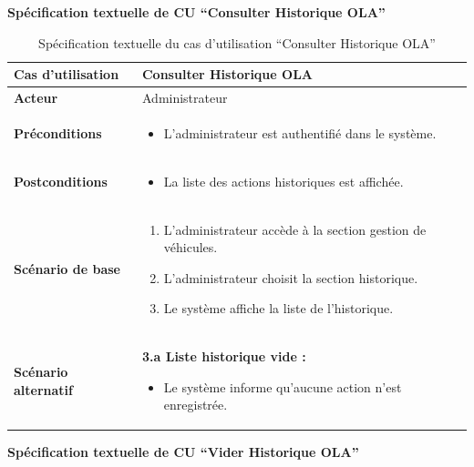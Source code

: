 \documentclass[a4paper,11pt]{report}
\begin{document}
\textbf{Spécification textuelle de CU ``Consulter Historique OLA''}

\begin{table}[H]
  \centering
  \renewcommand{\arraystretch}{1.5}
  \caption{Spécification textuelle du cas d’utilisation ``Consulter Historique OLA''}
  \begin{tabularx}{\textwidth}{|l|X|}
    \hline
    \textbf{Cas d’utilisation}    & Consulter Historique OLA \\ \hline
    \textbf{Acteur}               & Administrateur \\ \hline
    \textbf{Préconditions}        &
      \begin{itemize}[left=0pt]
        \item L’administrateur est authentifié dans le système.
      \end{itemize} \\ \hline
    \textbf{Postconditions}       &
      \begin{itemize}[left=0pt]
        \item La liste des actions historiques est affichée.
      \end{itemize} \\ \hline
    \textbf{Scénario de base}     &
      \begin{enumerate}[left=0pt]
        \item L’administrateur accède à la section gestion de véhicules.
        \item L’administrateur choisit la section historique.
        \item Le système affiche la liste de l’historique.
      \end{enumerate} \\ \hline
    \textbf{Scénario alternatif}  &
      \textbf{3.a Liste historique vide :}
      \begin{itemize}[left=1em]
        \item Le système informe qu’aucune action n’est enregistrée.
      \end{itemize} \\ \hline
  \end{tabularx}
\end{table}
\begingroup
\small
\setlength{\tabcolsep}{4pt} %
\renewcommand{\arraystretch}{1.1} %

\newpage
\textbf{Spécification textuelle de CU ``Vider Historique OLA''}
\end{document}
